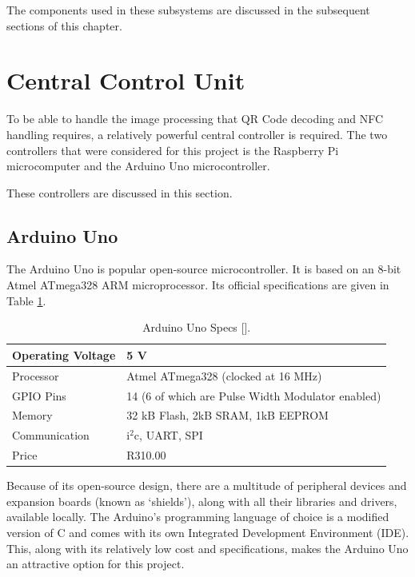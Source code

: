 The components used in these subsystems are discussed in the subsequent sections of this
chapter.

\section{Central Control Unit}

To be able to handle the image processing that QR Code decoding and NFC handling requires, a
relatively powerful central controller is required. The two controllers  that
were considered for this project is the Raspberry Pi microcomputer and the
Arduino Uno microcontroller.

These controllers are discussed in this section.

\subsection{Arduino Uno}

The Arduino Uno is popular open-source microcontroller. It is based on an 8-bit
Atmel ATmega328 ARM microprocessor. Its official specifications are given in
Table \ref{tab:arduino-specs}.

\begin{table}
\centering
\caption[Arduino Uno Specs.]{Arduino Uno Specs [\cite{manual:arduino-specs}].}
  \begin{tabular}{|l|l|}
  \hline
    Operating Voltage & 5 V \\\hline
    Processor & Atmel ATmega328 (clocked at 16 MHz) \\\hline
    GPIO Pins & 14 (6 of which are Pulse Width Modulator enabled) \\\hline
    Memory & 32 kB Flash, 2kB SRAM, 1kB EEPROM \\\hline
    Communication & i$^2$c, UART, SPI \\\hline
    Price & R310.00 \\\hline
  \end{tabular}
  \label{tab:arduino-specs}
\end{table}

Because of its open-source design, there are a multitude of peripheral devices and expansion
boards (known as `shields'), along with all their libraries and drivers,
available locally. The Arduino's programming language of choice is a modified version of
C and comes with its own Integrated Development Environment (IDE). This, along
with its relatively low cost and specifications, makes the Arduino Uno
an attractive option for this project.


